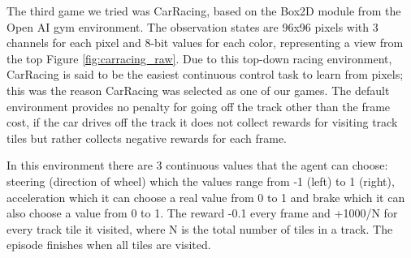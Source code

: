 \documentclass{article}
\begin{document}

The third game we tried was CarRacing, based on the Box2D module from the Open AI gym environment. The observation states are 96x96 pixels with 3 channels for each pixel and 8-bit values for each color, representing a view from the top Figure \ref{fig:carracing_raw}. Due to this top-down racing environment, CarRacing is said to be the easiest continuous control task to learn from pixels; this was the reason CarRacing was selected as one of our games. The default environment provides no penalty for going off the track other than the frame cost, if the car drives off the track it does not collect rewards for visiting track tiles but rather collects negative rewards for each frame.

In this environment there are 3 continuous values that the agent can choose: steering (direction of wheel) which the values range from -1 (left) to 1 (right), acceleration which it can choose a real value from 0 to 1 and brake which it can also choose a value from 0 to 1. The reward -0.1 every frame and +1000/N for every track tile it visited, where N is the total number of tiles in a track. The episode finishes when all tiles are visited. 
\end{document}
